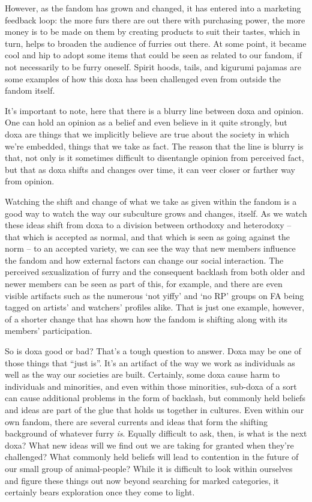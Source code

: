 \begin{description}
  However, as the fandom has grown and changed, it has entered into a marketing feedback loop: the more furs there are out there with purchasing power, the more money is to be made on them by creating products to suit their tastes, which in turn, helps to broaden the audience of furries out there.  At some point, it became cool and hip to adopt some items that could be seen as related to our fandom, if not necessarily to be furry oneself.  Spirit hoods, tails, and kigurumi pajamas are some examples of how this doxa has been challenged even from outside the fandom itself.
\end{description}

It’s important to note, here that there is a blurry line between doxa and opinion.  One can hold an opinion as a belief and even believe in it quite strongly, but doxa are things that we implicitly believe are true about the society in which we’re embedded, things that we take as fact.  The reason that the line is blurry is that, not only is it sometimes difficult to disentangle opinion from perceived fact, but that as doxa shifts and changes over time, it can veer closer or farther way from opinion.

Watching the shift and change of what we take as given within the fandom is a good way to watch the way our subculture grows and changes, itself.  As we watch these ideas shift from doxa to a division between orthodoxy and heterodoxy -- that which is accepted as normal, and that which is seen as going against the norm -- to an accepted variety, we can see the way that new members influence the fandom and how external factors can change our social interaction.  The perceived sexualization of furry and the consequent backlash from both older and newer members can be seen as part of this, for example, and there are even visible artifacts such as the numerous ‘not yiffy’ and ‘no RP’ groups on FA being tagged on artists’ and watchers’ profiles alike.  That is just one example, however, of a shorter change that has shown how the fandom is shifting along with its members’ participation.

So is doxa good or bad?  That’s a tough question to answer.  Doxa may be one of those things that ``just is''.  It’s an artifact of the way we work as individuals as well as the way our societies are built.  Certainly, some doxa cause harm to individuals and minorities, and even within those minorities, sub-doxa of a sort can cause additional problems in the form of backlash, but commonly held beliefs and ideas are part of the glue that holds us together in cultures.  Even within our own fandom, there are several currents and ideas that form the shifting background of whatever furry \textit{is}.  Equally difficult to ask, then, is what is the next doxa?  What new ideas will we find out we are taking for granted when they’re challenged?  What commonly held beliefs will lead to contention in the future of our small group of animal-people?  While it is difficult to look within ourselves and figure these things out now beyond searching for marked categories, it certainly bears exploration once they come to light.
